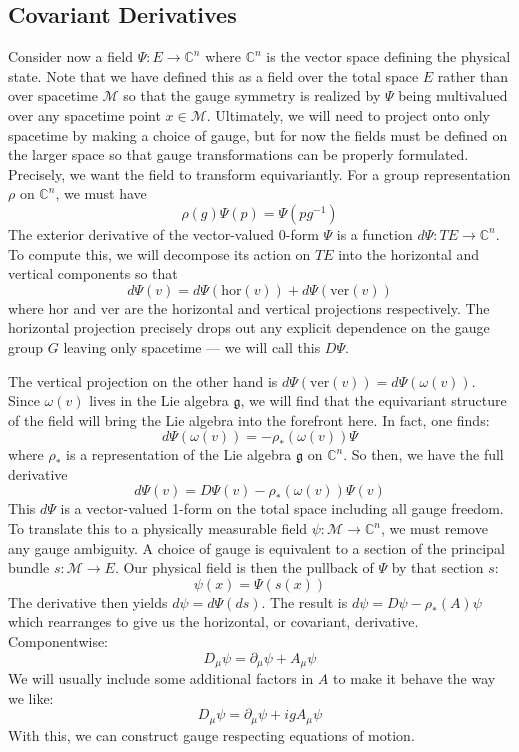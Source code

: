 \documentclass[onecolumn]{gwclass}
\renewcommand{\t}[1]{\text{#1}}
\newcommand{\man}{\mathcal{M}}
\newcommand{\C}{\mathbb{C}}
\begin{document}
\subsection{Covariant Derivatives}
Consider now a field $\Psi:E\to \C^n$ where $\C^n$ is the vector space defining the physical state. Note that we have defined this as a field over the total space $E$ rather than over spacetime $\man$ so that the gauge symmetry is realized by $\Psi$ being multivalued over any spacetime point $x\in\man$. Ultimately, we will need to project onto only spacetime by making a choice of gauge, but for now the fields must be defined on the larger space so that gauge transformations can be properly formulated. Precisely, we want the field to transform equivariantly. For a group representation $\rho$ on $\C^n$, we must have
$$ \rho(g)\Psi(p) = \Psi(pg^{-1})$$
The exterior derivative of the vector-valued 0-form $\Psi$ is a function $d\Psi:TE\to \C^n$. To compute this, we will decompose its action on $TE$ into the horizontal and vertical components so that
$$ d\Psi(v) = d\Psi(\t{hor}(v)) + d\Psi(\t{ver}(v)) $$
where $\t{hor}$ and $\t{ver}$ are the horizontal and vertical projections respectively. The horizontal projection precisely drops out any explicit dependence on the gauge group $G$ leaving only spacetime --- we will call this $D\Psi$. 

The vertical projection on the other hand is $d\Psi(\t{ver}(v)) = d\Psi(\omega(v))$. Since $\omega(v)$ lives in the Lie algebra $\mathfrak{g}$, we will find that the equivariant structure of the field will bring the Lie algebra into the forefront here. In fact, one finds:
$$ d\Psi(\omega(v)) = -\rho_*(\omega(v)) \Psi $$
where $\rho_*$ is a representation of the Lie algebra $\mathfrak{g}$ on $\C^n$. So then, we have the full derivative
$$ d\Psi(v) = D\Psi(v) - \rho_*(\omega(v))\Psi(v) $$
This $d\Psi$ is a vector-valued 1-form on the total space including all gauge freedom. To translate this to a physically measurable field $\psi:\man\to\C^n$, we must remove any gauge ambiguity. A choice of gauge is equivalent to a section of the principal bundle $s:\man\to E$. Our physical field is then the pullback of $\Psi$ by that section $s$:
$$ \psi(x) = \Psi(s(x)) $$
The derivative then yields $d\psi = d\Psi(ds)$. The result is $ d\psi = D\psi - \rho_*(A)\psi $ which rearranges to give us the horizontal, or covariant, derivative. Componentwise:
$$ D_\mu\psi = \partial_\mu\psi + A_\mu\psi $$
We will usually include some additional factors in $A$ to make it behave the way we like:
$$ D_\mu\psi = \partial_\mu\psi + igA_\mu\psi $$
With this, we can construct gauge respecting equations of motion.
\end{document}
